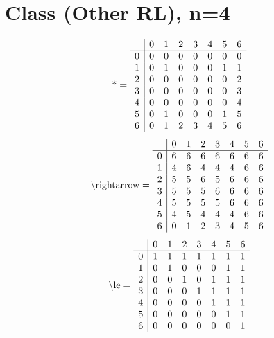 \documentclass[11pt]{article}
\begin{document}
\section{Class (Other RL), n=4}
\[\text{*} = 
\begin{array}{r | r r r r r r r}
 & 0 & 1 & 2 & 3 & 4 & 5 & 6 \\ \hline
0 & 0 & 0 & 0 & 0 & 0 & 0 & 0 \\
1 & 0 & 1 & 0 & 0 & 0 & 1 & 1 \\
2 & 0 & 0 & 0 & 0 & 0 & 0 & 2 \\
3 & 0 & 0 & 0 & 0 & 0 & 0 & 3 \\
4 & 0 & 0 & 0 & 0 & 0 & 0 & 4 \\
5 & 0 & 1 & 0 & 0 & 0 & 1 & 5 \\
6 & 0 & 1 & 2 & 3 & 4 & 5 & 6 \\
\end{array}
\]
\[\text{\textbackslash rightarrow} = 
\begin{array}{r | r r r r r r r}
 & 0 & 1 & 2 & 3 & 4 & 5 & 6 \\ \hline
0 & 6 & 6 & 6 & 6 & 6 & 6 & 6 \\
1 & 4 & 6 & 4 & 4 & 4 & 6 & 6 \\
2 & 5 & 5 & 6 & 5 & 6 & 6 & 6 \\
3 & 5 & 5 & 5 & 6 & 6 & 6 & 6 \\
4 & 5 & 5 & 5 & 5 & 6 & 6 & 6 \\
5 & 4 & 5 & 4 & 4 & 4 & 6 & 6 \\
6 & 0 & 1 & 2 & 3 & 4 & 5 & 6 \\
\end{array}
\]
\[\text{\textbackslash le} = 
\begin{array}{r | r r r r r r r}
 & 0 & 1 & 2 & 3 & 4 & 5 & 6 \\ \hline
0 & 1 & 1 & 1 & 1 & 1 & 1 & 1 \\
1 & 0 & 1 & 0 & 0 & 0 & 1 & 1 \\
2 & 0 & 0 & 1 & 0 & 1 & 1 & 1 \\
3 & 0 & 0 & 0 & 1 & 1 & 1 & 1 \\
4 & 0 & 0 & 0 & 0 & 1 & 1 & 1 \\
5 & 0 & 0 & 0 & 0 & 0 & 1 & 1 \\
6 & 0 & 0 & 0 & 0 & 0 & 0 & 1 \\
\end{array}
\]
\end{document}
